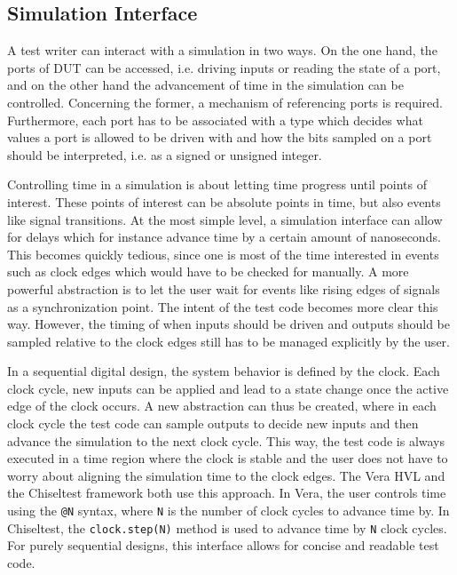 \documentclass[11pt,a4paper]{report}
\newcommand{\ttt}{\texttt}
\begin{document}
\subsection{Simulation Interface} %

A test writer can interact with a simulation in two ways. On the one hand, the ports of DUT can be accessed, i.e. driving inputs or reading the state of a port, and on the other hand the advancement of time in the simulation can be controlled. Concerning the former, a mechanism of referencing ports is required. Furthermore, each port has to be associated with a type which decides what values a port is allowed to be driven with and how the bits sampled on a port should be interpreted, i.e. as a signed or unsigned integer.

Controlling time in a simulation is about letting time progress until points of interest. These points of interest can
be absolute points in time, but also events like signal transitions. At the most simple level, a simulation interface
can allow for delays which for instance advance time by a certain amount of nanoseconds. This becomes quickly
tedious, since one is most of the time interested in events such as clock edges which would have to be checked for
manually. A more powerful abstraction is to let the user wait for events like rising edges of signals as a
synchronization point. The intent of the test code becomes more clear this way. However, the timing of when inputs should be driven and outputs should be sampled relative to the clock edges still has to be managed explicitly by the user.

In a sequential digital design, the system behavior is defined by the clock. Each clock cycle, new inputs can be
applied and lead to a state change once the active edge of the clock occurs. A new abstraction can thus be created,
where in each clock cycle the test code can sample outputs to decide new inputs and then advance the simulation to
the next clock cycle. This way, the test code is always executed in a time region where the clock is stable and the
user does not have to worry about aligning the simulation time to the clock edges. The Vera \cite[Sec. 7]{flake2020a}
HVL and the Chiseltest \cite{chiseltest} framework both use this approach. In Vera, the user controls time using the
\ttt{@N} syntax, where \ttt{N} is the number of clock cycles to advance time by. In Chiseltest, the
\ttt{clock.step(N)} method is used to advance time by \ttt{N} clock cycles. For purely sequential designs, this
interface allows for concise and readable test code.
\end{document}
